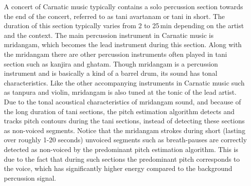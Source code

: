 {A concert of Carnatic music typically contains a solo percussion section towards the end of the concert, referred to as \gls{tani} avartanam or \gls{tani} in short. The duration of this section typically varies from 2 to 25\,min depending on the artist and the context. The main percussion instrument in Carnatic music is \gls{mridangam}, which becomes the lead instrument during this section. Along with the \gls{mridangam} there are other percussion instruments often played in \gls{tani} section such as \gls{kanjira} and \gls{ghatam}. Though \gls{mridangam} is a percussion instrument and is basically a kind of a barrel drum, its sound has tonal characteristics. Like the other accompanying instruments in Carnatic music such as \gls{tanpura} and violin, \gls{mridangam} is also tuned at the tonic of the lead artist. Due to the tonal acoustical characteristics of \gls{mridangam} sound, and because of the long duration of \gls{tani} sections, the pitch estimation algorithm detects and tracks pitch contours during the \gls{tani} sections, instead of detecting these sections as non-voiced segments. Notice that the \gls{mridangam} strokes during short (lasting over roughly 1-20 seconds) unvoiced segments such as breath-pauses are correctly detected as non-voiced by the predominant pitch estimation algorithm. This is due to the fact that during such sections the predominant pitch corresponds to the voice, which has significantly higher energy compared to the background percussion signal. 


}
